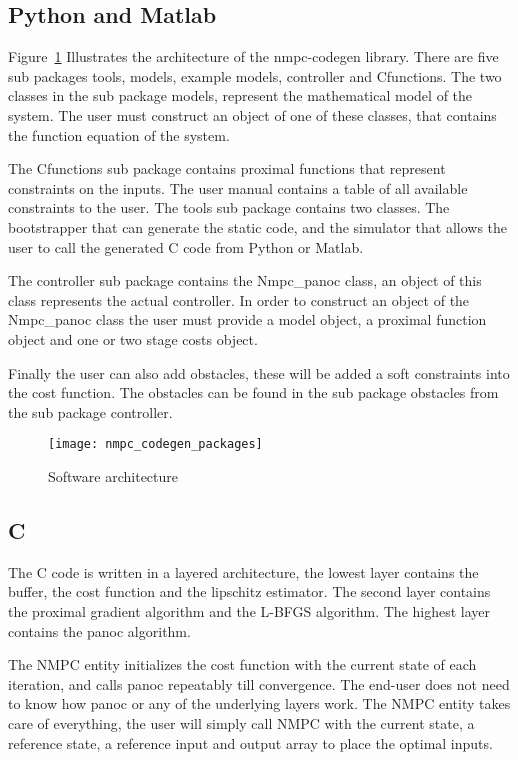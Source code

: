 \subsection{Python and Matlab}
Figure~\ref{fig:nmpc_codegen_packages} Illustrates the architecture of the nmpc-codegen library. There are five sub packages tools, models, example models, controller and Cfunctions.  The two classes in the sub package models, represent the mathematical model of the system. The user must construct an object of one of these classes, that contains the function equation of the system.

The Cfunctions sub package contains proximal functions that represent constraints on the inputs. The user manual contains a table of all available constraints to the user. The tools sub package contains two classes. The bootstrapper that can generate the static code, and the simulator that allows the user to call the generated C code from Python or Matlab.

The controller sub package contains the Nmpc\_panoc class, an object of this class represents the actual controller. In order to construct an object of the Nmpc\_panoc class the user must provide a model object, a proximal function object and one or two stage costs object.

Finally the user can also add obstacles, these will be added a soft constraints into the cost function. The obstacles can be found in the sub package obstacles from the sub package controller.
	\begin{figure}[H]
		\centering
		\texttt{[image: nmpc\_codegen\_packages]}
		\caption{Software architecture}
		\label{fig:nmpc_codegen_packages}
	\end{figure}

\subsection{C}
The C code is written in a layered architecture, the lowest layer contains the buffer, the cost function and the lipschitz estimator. The second layer contains the proximal gradient algorithm and the L-BFGS algorithm. The highest layer contains the panoc algorithm.

The NMPC entity initializes the cost function with the current state of each iteration, and calls panoc repeatably till convergence. The end-user does not need to know how panoc or any of the underlying layers work. The NMPC entity takes care of everything, the user will simply call NMPC with the current state, a reference state, a reference input and output array to place the optimal inputs.

